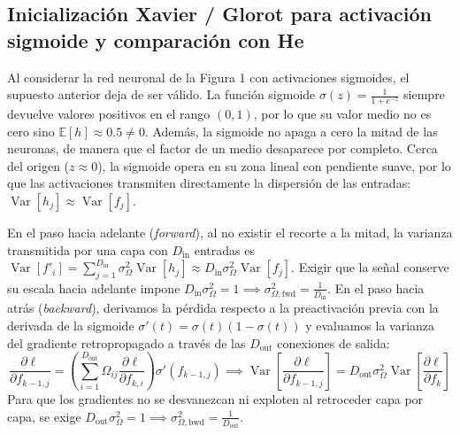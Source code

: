 \documentclass[10pt,a4paper]{article}
\begin{document}
{\clearpage
\subsection*{Inicialización Xavier / Glorot para activación sigmoide y comparación con He}

Al considerar la red neuronal de la Figura 1 con activaciones sigmoides, el supuesto anterior deja de ser válido. La función sigmoide $\sigma(z) = \frac{1}{1 + e^{-z}}$ siempre devuelve valores positivos en el rango $(0, 1)$, por lo que su valor medio no es cero sino $\mathbb{E}[h] \approx 0.5 \neq 0$. Además, la sigmoide no apaga a cero la mitad de las neuronas, de manera que el factor de un medio desaparece por completo. Cerca del origen ($z \approx 0$), la sigmoide opera en su zona lineal con pendiente suave, por lo que las activaciones transmiten directamente la dispersión de las entradas: $\operatorname{Var}[h_j] \approx \operatorname{Var}[f_j]$.

En el paso hacia adelante (\textit{forward}), al no existir el recorte a la mitad, la varianza transmitida por una capa con $D_{\text{in}}$ entradas es $\operatorname{Var}[f'_i] = \sum_{j=1}^{D_{\text{in}}} \sigma_\Omega^2 \operatorname{Var}[h_j] \approx D_{\text{in}} \sigma_\Omega^2 \operatorname{Var}[f_j]$. Exigir que la señal conserve su escala hacia adelante impone $D_{\text{in}} \sigma_\Omega^2 = 1 \implies \sigma_{\Omega, \text{fwd}}^2 = \frac{1}{D_{\text{in}}}$. En el paso hacia atrás (\textit{backward}), derivamos la pérdida respecto a la preactivación previa con la derivada de la sigmoide $\sigma'(t) = \sigma(t)(1 - \sigma(t))$ y evaluamos la varianza del gradiente retropropagado a través de las $D_{\text{out}}$ conexiones de salida:
\[
\frac{\partial \ell}{\partial f_{k-1, j}} = \left( \sum_{i=1}^{D_{\text{out}}} \Omega_{ij} \frac{\partial \ell}{\partial f_{k, i}} \right) \sigma'(f_{k-1, j}) \implies \operatorname{Var}\left[\frac{\partial \ell}{\partial f_{k-1, j}}\right] = D_{\text{out}} \sigma_\Omega^2 \operatorname{Var}\left[\frac{\partial \ell}{\partial f_k}\right]
\]
Para que los gradientes no se desvanezcan ni exploten al retroceder capa por capa, se exige $D_{\text{out}} \sigma_\Omega^2 = 1 \implies \sigma_{\Omega, \text{bwd}}^2 = \frac{1}{D_{\text{out}}}$.

}
\end{document}
